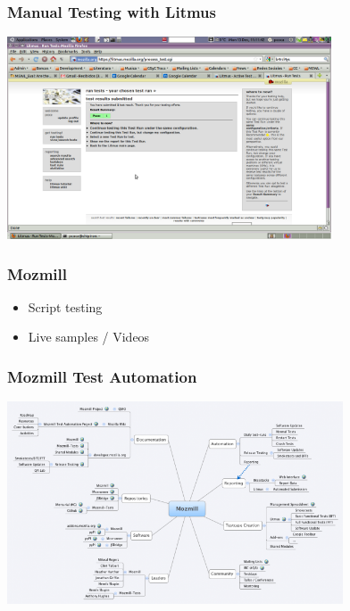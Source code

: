 \documentclass{beamer}
\begin{document}
\begin{frame}
\frametitle{Manual Testing with Litmus}
\begin{center}
 \includegraphics[height=6cm]{figs/Litmus_04_Test_Results_Submitted.png}
\begin{figure}
\end{figure}
\end{center}
\end{frame}


\begin{frame}
\frametitle{Mozmill}
 \begin{itemize}
  \item Script testing
  \item Live samples / Videos
 \end{itemize}
\end{frame}


\begin{frame}
\frametitle{Mozmill Test Automation}
\begin{center}
 \includegraphics[height=6cm]{figs/Mozmill_Test_Automation_Map.png}
\begin{figure}
\end{figure}
\end{center}
\end{frame}
\end{document}
